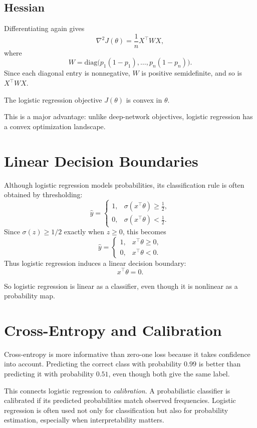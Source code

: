 \subsection{Hessian}

Differentiating again gives
\[
\nabla^2 J(\theta)
=
\frac1n X^\top W X,
\]
where
\[
W=\mathrm{diag}\big(p_1(1-p_1),\dots,p_n(1-p_n)\big).
\]
Since each diagonal entry is nonnegative, $W$ is positive semidefinite, and so is $X^\top W X$.

\begin{proposition}
The logistic regression objective $J(\theta)$ is convex in $\theta$.
\end{proposition}

This is a major advantage: unlike deep-network objectives, logistic regression has a convex optimization landscape.

\section{Linear Decision Boundaries}

Although logistic regression models probabilities, its classification rule is often obtained by thresholding:
\[
\hat y =
\begin{cases}
1, & \sigma(x^\top\theta)\ge \frac12,\\
0, & \sigma(x^\top\theta)< \frac12.
\end{cases}
\]
Since $\sigma(z)\ge 1/2$ exactly when $z\ge 0$, this becomes
\[
\hat y=
\begin{cases}
1, & x^\top\theta\ge 0,\\
0, & x^\top\theta<0.
\end{cases}
\]
Thus logistic regression induces a linear decision boundary:
\[
x^\top\theta=0.
\]

So logistic regression is linear as a classifier, even though it is nonlinear as a probability map.

\section{Cross-Entropy and Calibration}

Cross-entropy is more informative than zero-one loss because it takes confidence into account. Predicting the correct class with probability $0.99$ is better than predicting it with probability $0.51$, even though both give the same label.

This connects logistic regression to \emph{calibration}. A probabilistic classifier is calibrated if its predicted probabilities match observed frequencies. Logistic regression is often used not only for classification but also for probability estimation, especially when interpretability matters.

